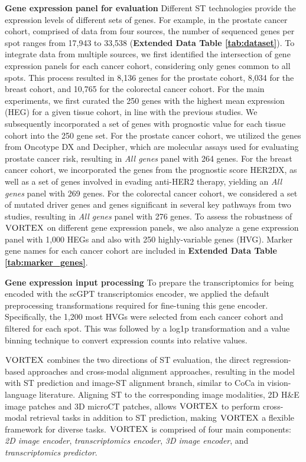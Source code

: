 \noindent\textbf{Gene expression panel for evaluation} 
Different ST technologies provide the expression levels of different sets of genes. For example, in the prostate cancer cohort, comprised of data from four sources, the number of sequenced genes per spot ranges from 17,943 to 33,538 (\textbf{Extended Data Table \ref{tab:dataset}}). To integrate data from multiple sources, we first identified the intersection of gene expression panels for each cancer cohort, considering only genes common to all spots. This process resulted in 8,136 genes for the prostate cohort, 8,034 for the breast cohort, and 10,765 for the colorectal cancer cohort. For the main experiments, we first curated the 250 genes with the highest mean expression (HEG) for a given tissue cohort, in line with the previous studies\cite{he2020integrating, chung2024accurate}. We subsequently incorporated a set of genes with prognostic value for each tissue cohort into the 250 gene set. For the prostate cancer cohort, we utilized the genes from Oncotype DX and Decipher, which are molecular assays used for evaluating prostate cancer risk, resulting in \textit{All genes} panel with 264 genes. For the breast cancer cohort, we incorporated the genes from the prognostic score HER2DX\cite{prat2020multivariable}, as well as a set of genes involved in evading anti-HER2 therapy\cite{smith2021her2+}, yielding an \textit{All genes} panel with 269 genes. For the colorectal cancer cohort, we considered a set of mutated driver genes and genes significant in several key pathways from two studies\cite{nunes2024prognostic,valdeolivas2024profiling}, resulting in \textit{All genes} panel with 276 genes. To assess the robustness of $\textsc{VORTEX}$ on different gene expression panels, we also analyze a gene expression panel with 1,000 HEGs and also with 250 highly-variable genes (HVG). Marker gene names for each cancer cohort are included in \textbf{Extended Data Table \ref{tab:marker_genes}}.

\noindent\textbf{Gene expression input processing} To prepare the transcriptomics for being encoded with the scGPT transcriptomics encoder\cite{cui2024scgpt}, we applied the default preprocessing transformations required for fine-tuning this gene encoder. Specifically, the 1,200 most HVGs were selected from each cancer cohort and filtered for each spot. This was followed by a log1p transformation and a value binning technique to convert expression counts into relative values.


$\textsc{VORTEX}$ combines the two directions of ST evaluation, the direct regression-based approaches\cite{he2020integrating} and cross-modal alignment approaches\cite{xie2024spatially, min2024multimodal}, resulting in the model with ST prediction and image-ST alignment branch, similar to CoCa\cite{yu2022coca} in vision-language literature. Aligning ST to the corresponding image modalities, 2D H\&E image patches and 3D microCT patches, allows $\textsc{VORTEX}$ to perform cross-modal retrieval tasks in addition to ST prediction, making $\textsc{VORTEX}$ a flexible framework for diverse tasks. 
$\textsc{VORTEX}$ is comprised of four main components: \textit{2D image encoder}, \textit{transcriptomics encoder}, \textit{3D image encoder}, and \textit{transcriptomics predictor}. 

